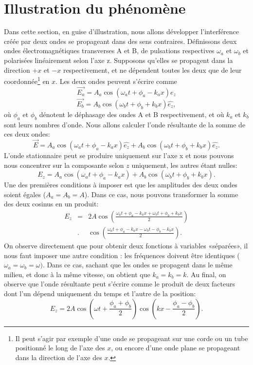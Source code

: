 \section{Illustration du phénomène}
Dans cette section, en guise d'illustration, nous allons développer l'interférence créée par deux ondes se propageant dans des sens contraires. Définissons deux ondes électromagnétiques transverses A et B, de pulsations respectives $\omega_a$ et $\omega_b$ et polarisées linéairement selon l'axe z. Supposons qu'elles se propagent dans la direction $+x$ et $-x$ respectivement, et ne dépendent toutes les deux que de leur coordonnée\footnote{Il peut s'agir par exemple d'une onde se propageant sur une corde ou un tube positionné le long de l'axe des $x$, ou encore d'une onde plane se propageant dans la direction de l'axe des $x$.} en $x$. Les deux ondes peuvent s'écrire comme 
$$ \vec{E_a}=A_a\cos(\omega_a t+ \phi_a-k_ax) \hat{e_z}$$
$$ \vec{E_b}=A_b\cos(\omega_b t+\phi_b+k_bx) \hat{e_z},$$
où $\phi_a$ et $\phi_b$ dénotent le déphasage des ondes A et B respectivement, et où $k_a$ et $k_b$ sont leurs nombres d'onde.
Nous allons calculer l'onde résultante de la somme de ces deux ondes: 
$$ \vec{E}=A_a\cos(\omega_a t+\phi_a-k_ax) \hat{e_z} + A_b\cos(\omega_b t+\phi_b+k_bx) \hat{e_z}.$$
L'onde stationnaire peut se produire uniquement sur l'axe x et nous pouvons nous concentrer sur la composante selon $z$ uniquement, les autres étant nulles:
$$ E_z=A_a\cos(\omega_a t+\phi_a-k_ax) + A_b\cos(\omega_b t+\phi_b+k_bx).$$
Une des premières conditions à imposer est que les amplitudes des deux ondes soient égales ($A_a=A_b=A$). Dans ce cas, nous pouvons transformer la somme des deux cosinus en un produit: 
\begin{eqnarray}
E_z&=&2A\cos\left(\frac{\omega_a t+\phi_a-k_ax+\omega_b t+\phi_b+k_bx}{2}\right)\nonumber \\&.&\cos\left(\frac{\omega_a t+\phi_a-k_ax-\omega_b t-\phi_b-k_bx}{2}\right).
\end{eqnarray}
On observe directement que pour obtenir deux fonctions à variables «séparées», il nous faut imposer une autre condition : les fréquences doivent être identiques ($\omega_a=\omega_b=\omega)$. Dans ce cas, sachant que les ondes se propagent dans le même milieu, et donc à la même vitesse, on obtient que $k_a=k_b=k$. Au final, on observe que l'onde résultante peut s'écrire comme le produit de deux facteurs dont l'un dépend uniquement du temps et l'autre de la position:
$$ E_z=2A\cos(\omega t+\frac{\phi_a+\phi_b}{2})\cos(kx-\frac{\phi_a-\phi_b}{2}).$$

